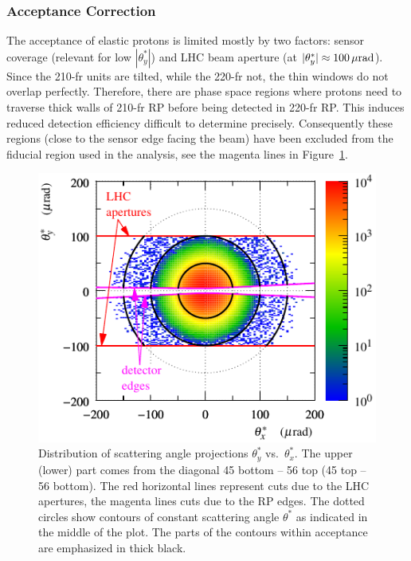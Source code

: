 
\subsubsection{Acceptance Correction}
\label{sec:acc corr}

The acceptance of elastic protons is limited mostly by two factors: sensor coverage (relevant for low $|\theta^*_y|$) and LHC beam aperture (at $|\theta^*_y| \approx 100\,{\rm \mu rad}$). Since the 210-fr units are tilted, while the 220-fr not, the thin windows do not overlap perfectly. Therefore, there are phase space regions where protons need to traverse thick walls of 210-fr RP before being detected in 220-fr RP. This induces reduced detection efficiency difficult to determine precisely. Consequently these regions (close to the sensor edge facing the beam) have been excluded from the fiducial region used in the analysis, see the magenta lines in Figure~\ref{fig:acc corr princ}.

\begin{figure}
\begin{center}
\includegraphics{fig/acc_phi_lab.pdf}
\caption{%
Distribution of scattering angle projections $\theta_y^*$ vs.~$\theta_x^*$. The upper (lower) part comes from the diagonal 45 bottom -- 56 top (45 top -- 56 bottom). The red horizontal lines represent cuts due to the LHC apertures, the magenta lines cuts due to the RP edges. The dotted circles show contours of constant scattering angle $\theta^*$ as indicated in the middle of the plot. The parts of the contours within acceptance are emphasized in thick black.
}
\label{fig:acc corr princ}
\end{center}
\end{figure}

